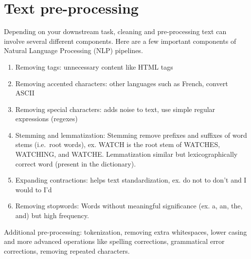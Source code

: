 \documentclass[11pt]{article}
\begin{document}
    \hypertarget{text-pre-processing}{%
\section{Text pre-processing}\label{text-pre-processing}}

    Depending on your downstream task, cleaning and pre-processing text can
involve several different components. Here are a few important
components of Natural Language Processing (NLP) pipelines.

\begin{enumerate}
\def\labelenumi{\arabic{enumi}.}
\item
  Removing tags: unnecessary content like HTML tags
\item
  Removing accented characters: other languages such as French, convert
  ASCII
\item
  Removing special characters: adds noise to text, use simple regular
  expressions (regexes)
\item
  Stemming and lemmatization: Stemming remove prefixes and suffixes of
  word stems (i.e.~root words), ex. WATCH is the root stem of WATCHES,
  WATCHING, and WATCHE. Lemmatization similar but lexicographically
  correct word (present in the dictionary).
\item
  Expanding contractions: helps text standardization, ex. do not to
  don't and I would to I'd
\item
  Removing stopwords: Words without meaningful significance (ex. a, an,
  the, and) but high frequency.
\end{enumerate}

Additional pre-processing: tokenization, removing extra whitespaces,
lower casing and more advanced operations like spelling corrections,
grammatical error corrections, removing repeated characters.
\end{document}
